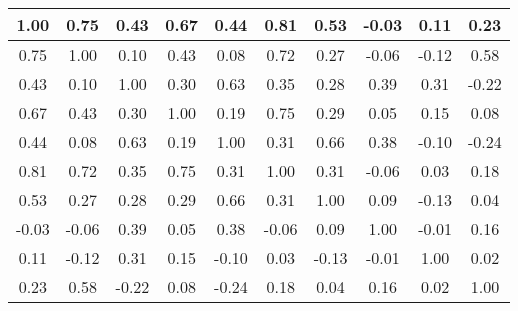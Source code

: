 \begin{tabular}{|c|c|c|c|c|c|c|c|c|c|}
\hline
1.00&0.75&0.43&0.67&0.44&0.81&0.53&-0.03&0.11&0.23\\\hline
0.75&1.00&0.10&0.43&0.08&0.72&0.27&-0.06&-0.12&0.58\\\hline
0.43&0.10&1.00&0.30&0.63&0.35&0.28&0.39&0.31&-0.22\\\hline
0.67&0.43&0.30&1.00&0.19&0.75&0.29&0.05&0.15&0.08\\\hline
0.44&0.08&0.63&0.19&1.00&0.31&0.66&0.38&-0.10&-0.24\\\hline
0.81&0.72&0.35&0.75&0.31&1.00&0.31&-0.06&0.03&0.18\\\hline
0.53&0.27&0.28&0.29&0.66&0.31&1.00&0.09&-0.13&0.04\\\hline
-0.03&-0.06&0.39&0.05&0.38&-0.06&0.09&1.00&-0.01&0.16\\\hline
0.11&-0.12&0.31&0.15&-0.10&0.03&-0.13&-0.01&1.00&0.02\\\hline
0.23&0.58&-0.22&0.08&-0.24&0.18&0.04&0.16&0.02&1.00\\\hline
\end{tabular}
